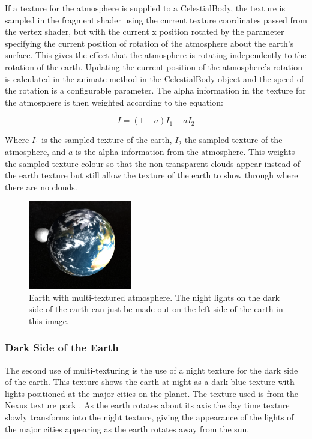\documentclass[conference]{IEEEtran}
\begin{document}
If a texture for the atmosphere is supplied to a CelestialBody, the texture is sampled in the fragment shader using the current texture coordinates passed from the vertex shader, but with the current x position rotated by the parameter specifying the current position of rotation of the atmosphere about the earth's surface. This gives the effect that the atmosphere is rotating independently to the rotation of the earth. Updating the current position of the atmosphere's rotation is calculated in the animate method in the CelestialBody object and the speed of the rotation is a configurable parameter. The alpha information in the texture for the atmosphere is then weighted according to the equation:

\begin{equation} \label{eq:transparent-texture}
I = (1-a)I_1 + aI_2
\end{equation}

Where $I_1$ is the sampled texture of the earth, $I_2$ the sampled texture of the atmosphere, and $a$ is the alpha information from the atmosphere. This weights the sampled texture colour so that the non-transparent clouds appear instead of the earth texture but still allow the texture of the earth to show through where there are no clouds.

\begin{figure}[!t]
\centering
\includegraphics[width=0.4\textwidth]{img/earth.png}
\caption{Earth with multi-textured atmosphere. The night lights on the dark side of the earth can just be made out on the left side of the earth in this image.}
\label{fig:earth-multi-texture}
\end{figure}

\subsubsection{Dark Side of the Earth}
The second use of multi-texturing is the use of a night texture for the dark side of the earth. This texture shows the earth at night as a dark blue texture with lights positioned at the major cities on the planet. The texture used is from the Nexus texture pack \cite{nexustextures}. As the earth rotates about its axis the day time texture slowly transforms into the night texture, giving the appearance of the lights of the major cities appearing as the earth rotates away from the sun. 
\end{document}
